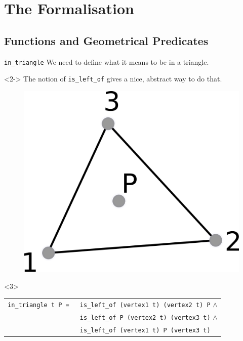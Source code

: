\documentclass[18pt]{beamer}
\begin{document}
\section{The Formalisation}


\subsection{Functions and Geometrical Predicates}



\begin{frame}{\tt in\_triangle}
 We need to define what it means to be in a triangle.

\begin{minipage}{.6\textwidth}
\begin{uncoverenv}<2->
   The notion of {\tt is\_left\_of} gives a nice, abstract way to do that.
 \end{uncoverenv}
   \end{minipage}%
  \begin{minipage}{.4\textwidth}
  \begin{overprint}

        \begin{figure}
  	\centering
 	\includegraphics{intriangle}
      \end{figure}
  \end{overprint}
\end{minipage}
\begin{uncoverenv}<3>
 
 {\small \begin{tabular}{ll}
       {\tt in\_triangle t P = }& {\tt is\_left\_of (vertex1 t) (vertex2 t) P} $\wedge$\\
        &{\tt is\_left\_of P (vertex2 t) (vertex3 t)} $\wedge$\\
  & {\tt is\_left\_of (vertex1 t) P (vertex3 t)}
      \end{tabular}}

\end{uncoverenv}
\end{frame}
\end{document}
